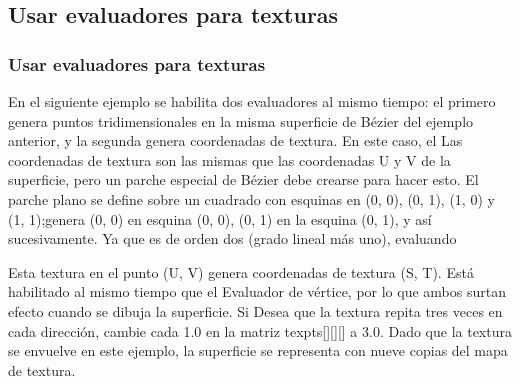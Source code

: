 \documentclass[10.5pt]{beamer}
\begin{document}
\subsection{Usar evaluadores para texturas}
\begin{frame}[fragile]
\frametitle{Usar evaluadores para texturas}
\small
En el siguiente ejemplo se  habilita dos evaluadores al mismo tiempo: el primero genera puntos tridimensionales en
la misma superficie de Bézier del ejemplo anterior, y la segunda genera coordenadas de textura. En este caso, el
Las coordenadas de textura son las mismas que las coordenadas U y V de la superficie, pero un parche especial de Bézier
debe crearse para hacer esto.
El parche plano se define sobre un cuadrado con esquinas en (0, 0), (0, 1), (1, 0) y (1, 1);genera (0, 0) en
esquina (0, 0), (0, 1) en la esquina (0, 1), y así sucesivamente. Ya que es de orden dos (grado lineal más uno), evaluando

Esta textura en el punto (U, V) genera coordenadas de textura (S, T). Está habilitado al mismo tiempo que el
Evaluador de vértice, por lo que ambos surtan efecto cuando se dibuja la superficie. Si
Desea que la textura repita tres veces en cada dirección, cambie cada 1.0 en la matriz texpts[][][] a 3.0.
Dado que la textura se envuelve en este ejemplo, la superficie se representa con nueve copias del mapa de textura.
\end{frame}

\end{document}
